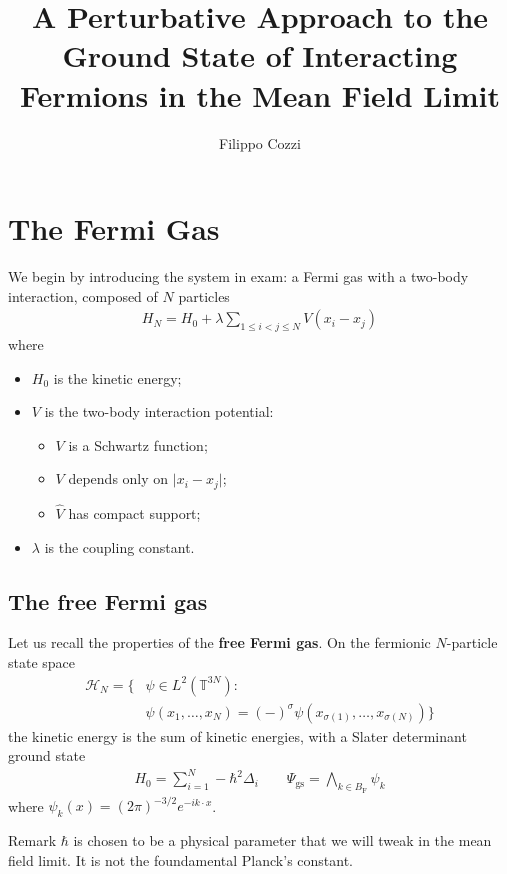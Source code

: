 \documentclass{beamer}
\title{A Perturbative Approach to the Ground State of Interacting Fermions in the Mean Field
Limit}
\author{Filippo Cozzi}
\begin{document}
\frame{\titlepage}




\section{The Fermi Gas}

\begin{frame}
	We begin by introducing the system in exam: a Fermi gas with a two-body interaction,
	composed of $N$ particles
	\begin{align*}
		H_N = H_0 + \lambda \sum_{1\leq i<j\leq N} V(x_i-x_j)
	\end{align*}
	where
	\begin{itemize}
		\item $H_0$ is the kinetic energy;
		\item $V$ is the two-body interaction potential:
			\begin{itemize}
				\item[(i)] $V$ is a Schwartz function;
				\item[(ii)] $V$ depends only on $\vert x_i-x_j\vert$;
				\item[(iii)] $\hat{V}$ has compact support;
			\end{itemize}
		\item $\lambda$ is the coupling constant.
	\end{itemize}
\end{frame}

\subsection{The free Fermi gas}

\begin{frame}
	Let us recall the properties of the \textbf{free Fermi gas}. On the fermionic $N$-particle
	state space
	\begin{align*}
		\mathcal{H}_N = \big\{
			&\psi\in L^2(\mathbb{T}^{3N}) : \\
			&\psi(x_1,\ldots,x_N) = (-)^\sigma\psi(x_{\sigma(1)},\ldots,x_{\sigma(N)})
		\big\}
	\end{align*}
	the kinetic energy is the sum of kinetic energies, with a Slater determinant ground state
	\begin{align*}
		H_0 = \sum_{i=1}^N -\hbar^2\Delta_i
		\qquad \Psi_{\mathrm{gs}} = \bigwedge_{k\in B_{\mathrm{F}}}\psi_k
	\end{align*}
	where $\psi_k(x) = (2\pi)^{-3/2}e^{-ik\cdot x}$.
	\begin{block}{Remark}
		$\hbar$ is chosen to be a physical parameter that we will tweak in the mean field
		limit. It is not the foundamental Planck's constant.
	\end{block}
\end{frame}
\end{document}
